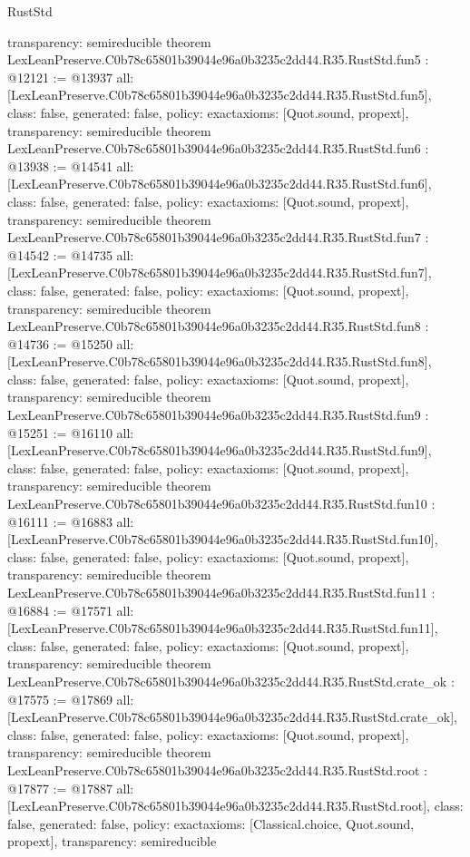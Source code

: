 \begin{lexlean}{RustStd}
\begin{coremodule}
{  transparency: semireducible
}
theorem LexLeanPreserve.C0b78c65801b39044e96a0b3235c2dd44.R35.RustStd.fun5 : @12121 := @13937 {
  all: [LexLeanPreserve.C0b78c65801b39044e96a0b3235c2dd44.R35.RustStd.fun5],
  class: false,
  generated: false,
  policy: exact{axioms: [Quot.sound, propext]},
  transparency: semireducible
}
theorem LexLeanPreserve.C0b78c65801b39044e96a0b3235c2dd44.R35.RustStd.fun6 : @13938 := @14541 {
  all: [LexLeanPreserve.C0b78c65801b39044e96a0b3235c2dd44.R35.RustStd.fun6],
  class: false,
  generated: false,
  policy: exact{axioms: [Quot.sound, propext]},
  transparency: semireducible
}
theorem LexLeanPreserve.C0b78c65801b39044e96a0b3235c2dd44.R35.RustStd.fun7 : @14542 := @14735 {
  all: [LexLeanPreserve.C0b78c65801b39044e96a0b3235c2dd44.R35.RustStd.fun7],
  class: false,
  generated: false,
  policy: exact{axioms: [Quot.sound, propext]},
  transparency: semireducible
}
theorem LexLeanPreserve.C0b78c65801b39044e96a0b3235c2dd44.R35.RustStd.fun8 : @14736 := @15250 {
  all: [LexLeanPreserve.C0b78c65801b39044e96a0b3235c2dd44.R35.RustStd.fun8],
  class: false,
  generated: false,
  policy: exact{axioms: [Quot.sound, propext]},
  transparency: semireducible
}
theorem LexLeanPreserve.C0b78c65801b39044e96a0b3235c2dd44.R35.RustStd.fun9 : @15251 := @16110 {
  all: [LexLeanPreserve.C0b78c65801b39044e96a0b3235c2dd44.R35.RustStd.fun9],
  class: false,
  generated: false,
  policy: exact{axioms: [Quot.sound, propext]},
  transparency: semireducible
}
theorem LexLeanPreserve.C0b78c65801b39044e96a0b3235c2dd44.R35.RustStd.fun10 : @16111 := @16883 {
  all: [LexLeanPreserve.C0b78c65801b39044e96a0b3235c2dd44.R35.RustStd.fun10],
  class: false,
  generated: false,
  policy: exact{axioms: [Quot.sound, propext]},
  transparency: semireducible
}
theorem LexLeanPreserve.C0b78c65801b39044e96a0b3235c2dd44.R35.RustStd.fun11 : @16884 := @17571 {
  all: [LexLeanPreserve.C0b78c65801b39044e96a0b3235c2dd44.R35.RustStd.fun11],
  class: false,
  generated: false,
  policy: exact{axioms: [Quot.sound, propext]},
  transparency: semireducible
}
theorem LexLeanPreserve.C0b78c65801b39044e96a0b3235c2dd44.R35.RustStd.crate_ok : @17575 := @17869 {
  all: [LexLeanPreserve.C0b78c65801b39044e96a0b3235c2dd44.R35.RustStd.crate_ok],
  class: false,
  generated: false,
  policy: exact{axioms: [Quot.sound, propext]},
  transparency: semireducible
}
theorem LexLeanPreserve.C0b78c65801b39044e96a0b3235c2dd44.R35.RustStd.root : @17877 := @17887 {
  all: [LexLeanPreserve.C0b78c65801b39044e96a0b3235c2dd44.R35.RustStd.root],
  class: false,
  generated: false,
  policy: exact{axioms: [Classical.choice, Quot.sound, propext]},
  transparency: semireducible
}


\end{coremodule}
\end{lexlean}
